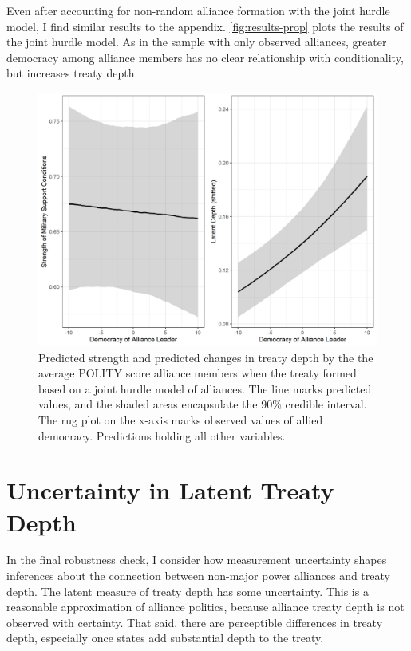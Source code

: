 \documentclass[12pt]{article}
\begin{document}
Even after accounting for non-random alliance formation with the joint hurdle model, I find similar results to the appendix. 
\autoref{fig:results-prop} plots the results of the joint hurdle model. 
As in the sample with only observed alliances, greater democracy among alliance members has no clear relationship with conditionality, but increases treaty depth. 


\begin{figure}
\includegraphics[width=.95\textwidth]{results-joint-hurdle.png}  
\caption{Predicted strength and predicted changes in treaty depth by the the average POLITY score alliance members when the treaty formed based on a joint hurdle model of alliances. The line marks predicted values, and the shaded areas encapsulate the 90\% credible interval. The rug plot on the x-axis marks observed values of allied democracy. Predictions holding all other variables.}
\label{fig:results-joint-hurdle}
\end{figure}




\section{Uncertainty in Latent Treaty Depth} 


In the final robustness check, I consider how measurement uncertainty shapes inferences about the connection between non-major power alliances and treaty depth. 
The latent measure of treaty depth has some uncertainty. 
This is a reasonable approximation of alliance politics, because alliance treaty depth is not observed with certainty. 
That said, there are perceptible differences in treaty depth, especially once states add substantial depth to the treaty. 
\end{document}

